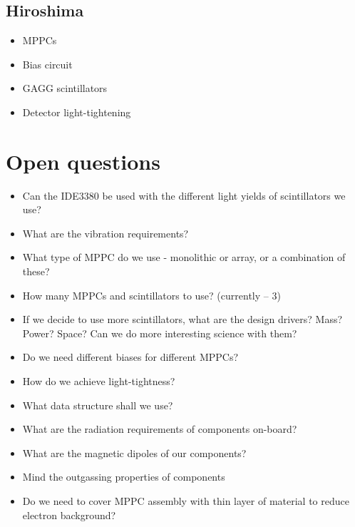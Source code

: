 \documentclass[a4paper,11pt]{article}
\begin{document}
\subsection{Hiroshima}

\begin{itemize}
  \item MPPCs
  \item Bias circuit
  \item GAGG scintillators
  \item Detector light-tightening
\end{itemize}

\section{Open questions}

\renewcommand{\labelitemi}{$\square$}

\begin{itemize}
  \item Can the IDE3380 be used with the different light yields of scintillators we use?
  \item What are the vibration requirements?
  \item What type of MPPC do we use - monolithic or array, or a combination of these?
  \item How many MPPCs and scintillators to use? (currently -- 3)
  \item If we decide to use more scintillators, what are the design drivers? Mass?
    Power? Space? Can we do more interesting science with them?
  \item Do we need different biases for different MPPCs?
  \item How do we achieve light-tightness?
  \item What data structure shall we use?
  \item What are the radiation requirements of components on-board?
  \item What are the magnetic dipoles of our components?
  \item Mind the outgassing properties of components
  \item Do we need to cover MPPC assembly with thin layer of material to reduce
  electron background?
\end{itemize}

\pagebreak


\end{document}

